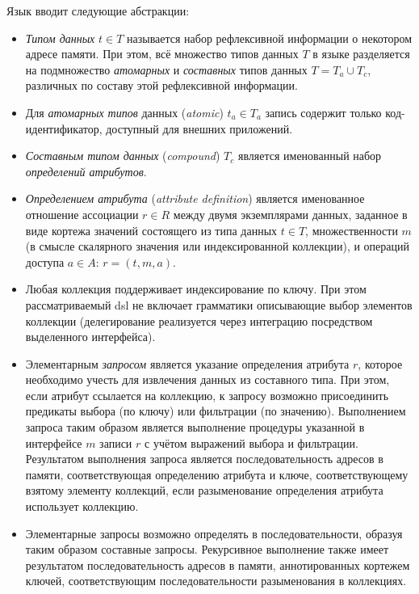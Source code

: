 Язык вводит следующие абстракции:
\begin{itemize}
    \item \emph{Типом данных} $t \in T$ называется набор рефлексивной
    информации о некотором адресе памяти. При этом, всё множество
    типов данных $T$ в языке разделяется на подмножество
    \emph{атомарных} и \emph{составных} типов данных $T = T_a \cup T_c$,
    различных по составу этой рефлексивной информации.
    \item Для \emph{атомарных типов} данных (\emph{atomic}) $t_a \in T_a$ запись
    содержит только код-идентификатор, доступный для внешних приложений.
    \item \emph{Составным типом данных} (\emph{compound}) $T_c$ является
    именованный набор \emph{определений атрибутов}.
    \item \emph{Определением атрибута} (\emph{attribute definition}) является
    именованное отношение ассоциации $r \in R$ между двумя экземплярами данных,
    заданное в виде кортежа значений состоящего из
    типа данных $t \in T$, множественности $m$ (в смысле скалярного значения или
    индексированной коллекции), и операций доступа $a \in A$: $r = (t,m,a)$.
    \item Любая коллекция поддерживает индексирование по ключу. При этом
    рассматриваемый \acrshort{dsl} не включает грамматики описывающие выбор
    элементов коллекции (делегирование реализуется через интеграцию
    посредством выделенного интерфейса).
    \item Элементарным \emph{запросом} является указание определения атрибута $r$, которое
    необходимо учесть для извлечения данных из составного типа. При этом,
    если атрибут ссылается на коллекцию, к запросу возможно присоединить
    предикаты выбора (по ключу) или фильтрации (по значению). Выполнением
    запроса таким образом является выполнение процедуры указанной в
    интерфейсе $m$ записи $r$ с учётом выражений выбора и фильтрации.
    Результатом выполнения запроса является последовательность адресов в памяти,
    соответствующая определению атрибута и ключе, соответствующему
    взятому элементу коллекций, если разыменование определения атрибута
    использует коллекцию.
    \item Элементарные запросы возможно определять в последовательности, образуя
    таким образом составные запросы. Рекурсивное выполнение также имеет
    результатом последовательность адресов в памяти, аннотированных кортежем
    ключей, соответствующим последовательности разыменования в коллекциях.
\end{itemize}

